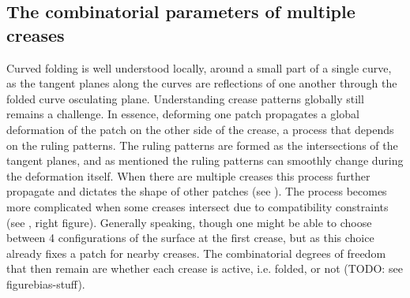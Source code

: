 

\subsection{The combinatorial parameters of multiple creases}
Curved folding is well understood locally, around a small part of a single curve, as the tangent planes along the curves are reflections of one another through the folded curve osculating plane. Understanding crease patterns globally still remains a challenge. In essence, deforming one patch propagates a global deformation of the patch on the other side of the crease, a process that depends on the ruling patterns. The ruling patterns are formed as the intersections of the tangent planes, and as mentioned the ruling patterns can smoothly change during the deformation itself. When there are multiple creases this process further propagate and dictates the shape of other patches (see ). The process becomes more complicated when some creases intersect due to compatibility constraints (see , right figure). Generally speaking, though one might be able to choose between 4 configurations of the surface at the first crease, but as this choice already fixes a patch for nearby creases. The combinatorial degrees of freedom that then remain are whether each crease is active, i.e. folded, or not (TODO: see figurebias-stuff).



